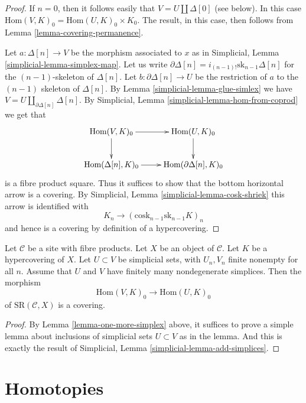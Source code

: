 \begin{proof}
If $n = 0$, then it follows easily that $V = U \amalg \Delta[0]$
(see below). In this case $\text{Hom}(V, K)_0 =
\text{Hom}(U, K)_0 \times K_0$. The result, in this case, then follows
from Lemma \ref{lemma-covering-permanence}.

\medskip\noindent
Let $a : \Delta[n] \to V$ be the morphism associated to $x$
as in Simplicial, Lemma \ref{simplicial-lemma-simplex-map}.
Let us write $\partial \Delta[n] = i_{(n-1)!} \text{sk}_{n - 1} \Delta[n]$
for the $(n - 1)$-skeleton of $\Delta[n]$.
Let $b : \partial \Delta[n] \to U$ be the restriction
of $a$ to the $(n - 1)$ skeleton of $\Delta[n]$.
By Lemma \ref{simplicial-lemma-glue-simlex}
we have $V = U \amalg_{\partial \Delta[n]} \Delta[n]$.
By Simplicial, Lemma \ref{simplicial-lemma-hom-from-coprod} we get
that
$$
\xymatrix{
\text{Hom}(V, K)_0 \ar[r] \ar[d] &
\text{Hom}(U, K)_0 \ar[d] \\
\text{Hom}(\Delta[n], K)_0 \ar[r] &
\text{Hom}(\partial \Delta[n], K)_0
}
$$
is a fibre product square. Thus it suffices to show that
the bottom horizontal arrow is a covering. By
Simplicial, Lemma \ref{simplicial-lemma-cosk-shriek}
this arrow is identified with
$$
K_n \to (\text{cosk}_{n - 1} \text{sk}_{n - 1} K)_n
$$
and hence is a covering by definition of a hypercovering.
\end{proof}

\begin{lemma}
\label{lemma-add-simplices}
Let $\mathcal{C}$ be a site with fibre products.
Let $X$ be an object of $\mathcal{C}$.
Let $K$ be a hypercovering of $X$.
Let $U \subset V$ be simplicial sets, with $U_n, V_n$
finite nonempty for all $n$.
Assume that $U$ and $V$ have finitely many nondegenerate simplices.
Then the morphism
$$
\text{Hom}(V, K)_0
\longrightarrow
\text{Hom}(U, K)_0
$$
of $\text{SR}(\mathcal{C}, X)$ is a covering.
\end{lemma}

\begin{proof}
By Lemma \ref{lemma-one-more-simplex}
above, it suffices to prove a simple lemma
about inclusions of simplicial sets $U \subset V$ as in the
lemma. And this is exactly the result of
Simplicial, Lemma \ref{simplicial-lemma-add-simplices}.
\end{proof}




\section{Homotopies}
\label{section-homotopies}


